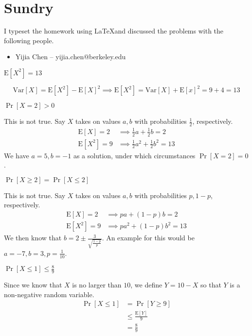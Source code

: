 \documentclass[11pt]{article}
\newcommand{\E}[0]{\mathrm{E}}
\newcommand{\Var}[0]{\mathrm{Var}}
\begin{document}
\section*{Sundry}

\begin{Answer}
    I typeset the homework using \LaTeX and discussed the problems with the following people.
    \begin{itemize}
        \item Yijia Chen -- yijia.chen@berkeley.edu
    \end{itemize}
\end{Answer}

\newpage
{}

\begin{Parts}
    
    \Part $\E[X^2] = 13$
    \begin{Answer}
        $$\Var [X] = \E[X^2] - \E[X]^2 \implies \E[X^2] = \Var[X] + \E[x]^2 = 9 + 4 = 13$$
    \end{Answer}

    \Part $\Pr[X=2] > 0$
    \begin{Answer}
        This is not true. Say $X$ takes on values $a,b$ with probabilities $\frac{1}{2}$, respectively. 
        \begin{align*}
            \E[X] = 2   &\implies \frac{1}{2}a + \frac{1}{2}b = 2 \\
            \E[X^2] = 9 &\implies \frac{1}{2}a^2 + \frac{1}{2}b^2 = 13 
        \end{align*}
        We have $a = 5, b = -1$ as a solution, under which circumstances $\Pr[X=2] = 0$. 
    \end{Answer}

    \Part $\Pr[X \geq 2] = \Pr[X \leq 2]$
    \begin{Answer}
        This is not true. Say $X$ takes on values $a,b$ with probabilities $p, 1-p$, respectively. 
        \begin{align*}
            \E[X] = 2   &\implies pa + (1-p)b = 2 \\
            \E[X^2] = 9 &\implies pa^2 + (1-p)b^2 = 13
        \end{align*}
        We then know that $b = 2 \pm \frac{3}{\sqrt{\frac{1-p}{p}}}$. An example for this would be 
        $a = -7, b = 3, p = \frac{1}{10}$. 
    \end{Answer}

    \newpage
    \Part $\Pr[X \leq 1] \leq \frac{8}{9}$
    \begin{Answer}
        Since we know that $X$ is no larger than $10$, we define $Y = 10 - X$ so that $Y$ is a non-negative random variable. 
        \begin{align*}
            \Pr[X \leq 1] &= \Pr[Y \geq 9] \\
                          &\leq \frac{\E[Y]}{9} \\
                          &= \frac{8}{9}
        \end{align*}
    \end{Answer}


\end{Parts}
\end{document}

